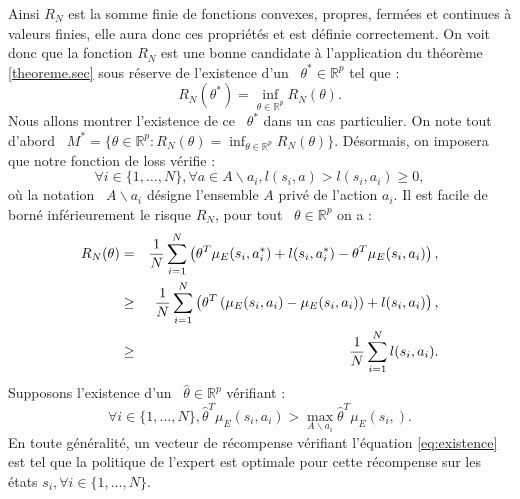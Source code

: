 \documentclass[publibook-draft]{CAp2012}
\begin{document}
Ainsi $R_N$ est la somme finie de fonctions convexes, propres, fermées et continues à valeurs finies, elle aura donc ces propriétés et est définie correctement. On voit donc que la fonction $R_N$ est une bonne candidate à l'application du théorème \ref{theoreme.sec} sous réserve de l'existence d'un ~$\theta^*\in\mathbb{R}^p$ tel que :
\begin{equation}
R_N(\theta^*)=\inf_{\theta \in \mathbb{R}^p}R_N(\theta).
\end{equation}
Nous allons montrer l'existence de ce ~$\theta^*$ dans un cas particulier. On note tout d'abord ~$M^*=\{\theta\in\mathbb{R}^p:R_N(\theta)=\inf_{\theta \in \mathbb{R}^p}R_N(\theta)\}$.
Désormais, on imposera que notre fonction de loss vérifie :
\begin{equation}
\forall i\in\{1,\dots,N\}, \forall a \in A \backslash a_i, l(s_i,a)>l(s_i,a_i)\geq0,
\end{equation}
où la notation ~$A \backslash a_i$ désigne l'ensemble $A$ privé de l'action $a_i$.
Il est facile de borné inférieurement le risque $R_N$, pour tout ~$\theta\in\mathbb{R}^p$ on a :
\begin{eqnarray}
   R_N(\theta) &=& {1\over N} \sum_{i=1}^N\left(\theta ^T \mu_E(s_i,a^*_i) + l(s_i,a^*_i) - \theta ^T \mu_E(s_i,a_i) \right),\\
   &\geq& {1\over N} \sum_{i=1}^N\left(\theta^T\left(\mu_E(s_i,a_i) - \mu_E(s_i,a_i)\right) + l(s_i,a_i)  \right),\\
   &\geq& {1\over N} \sum_{i=1}^Nl(s_i,a_i).
\end{eqnarray}
Supposons l'existence d'un ~$\hat{\theta}\in\mathbb{R}^p$ vérifiant :
\begin{equation}\label{eq:existence}
\forall i\in\{1,\dots,N\}, \hat{\theta}^T\mu_E(s_i,a_i)>\max_{A \backslash a_i}\hat{\theta}^T\mu_E(s_i,).
\end{equation}
En toute généralité, un vecteur de récompense vérifiant l'équation \ref{eq:existence} est tel que la politique de l'expert est optimale pour cette récompense sur les états
$s_i, \forall i\in\{1,\dots,N\}$.\\
\end{document}
